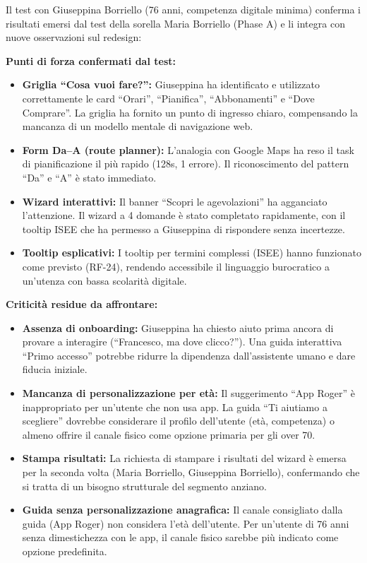 \documentclass[11pt,a4paper]{article}
\begin{document}
\begin{tcolorbox}[colback=sectionBg,colframe=primaryColor,arc=2mm]
\small

\noindent Il test con Giuseppina Borriello (76 anni, competenza digitale minima) conferma i risultati emersi dal test della sorella Maria Borriello (Phase A) e li integra con nuove osservazioni sul redesign:

\vspace{0.2cm}
\noindent\textbf{Punti di forza confermati dal test:}
\begin{itemize}
  \item \textbf{Griglia ``Cosa vuoi fare?'':} Giuseppina ha identificato e utilizzato correttamente le card ``Orari'', ``Pianifica'', ``Abbonamenti'' e ``Dove Comprare''. La griglia ha fornito un punto di ingresso chiaro, compensando la mancanza di un modello mentale di navigazione web.
  \item \textbf{Form Da--A (route planner):} L'analogia con Google Maps ha reso il task di pianificazione il pi\`u rapido (128s, 1 errore). Il riconoscimento del pattern ``Da'' e ``A'' \`e stato immediato.
  \item \textbf{Wizard interattivi:} Il banner ``Scopri le agevolazioni'' ha agganciato l'attenzione. Il wizard a 4 domande \`e stato completato rapidamente, con il tooltip ISEE che ha permesso a Giuseppina di rispondere senza incertezze.
  \item \textbf{Tooltip esplicativi:} I tooltip per termini complessi (ISEE) hanno funzionato come previsto (RF-24), rendendo accessibile il linguaggio burocratico a un'utenza con bassa scolarit\`a digitale.
\end{itemize}

\vspace{0.2cm}
\noindent\textbf{Criticit\`a residue da affrontare:}
\begin{itemize}
  \item \textbf{Assenza di onboarding:} Giuseppina ha chiesto aiuto prima ancora di provare a interagire (``Francesco, ma dove clicco?''). Una guida interattiva ``Primo accesso'' potrebbe ridurre la dipendenza dall'assistente umano e dare fiducia iniziale.
  \item \textbf{Mancanza di personalizzazione per et\`a:} Il suggerimento ``App Roger'' \`e inappropriato per un'utente che non usa app. La guida ``Ti aiutiamo a scegliere'' dovrebbe considerare il profilo dell'utente (et\`a, competenza) o almeno offrire il canale fisico come opzione primaria per gli over 70.
  \item \textbf{Stampa risultati:} La richiesta di stampare i risultati del wizard \`e emersa per la seconda volta (Maria Borriello, Giuseppina Borriello), confermando che si tratta di un bisogno strutturale del segmento anziano.
  \item \textbf{Guida senza personalizzazione anagrafica:} Il canale consigliato dalla guida (App Roger) non considera l'et\`a dell'utente. Per un'utente di 76 anni senza dimestichezza con le app, il canale fisico sarebbe pi\`u indicato come opzione predefinita.
\end{itemize}


\end{tcolorbox}
\end{document}
